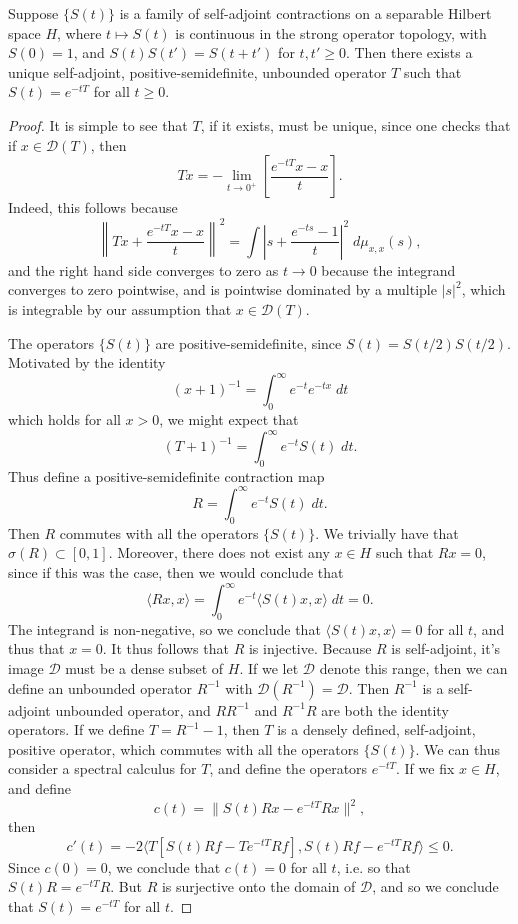 \begin{lemma}
    Suppose $\{ S(t) \}$ is a family of self-adjoint contractions on a separable Hilbert space $H$, where $t \mapsto S(t)$ is continuous in the strong operator topology, with $S(0) = 1$, and $S(t) S(t') = S(t + t')$ for $t,t' \geq 0$. Then there exists a unique self-adjoint, positive-semidefinite, unbounded operator $T$ such that $S(t) = e^{-tT}$ for all $t \geq 0$.
\end{lemma}
\begin{proof}
    It is simple to see that $T$, if it exists, must be unique, since one checks that if $x \in \mathcal{D}(T)$, then
    \[ Tx = - \lim_{t \to 0^+} \left[ \frac{e^{-tT} x - x}{t} \right]. \]
    Indeed, this follows because
    \[ \left\| Tx + \frac{e^{-tT} x - x}{t} \right\|^2 = \int \left| s + \frac{e^{-ts} - 1}{t} \right|^2 \;d\mu_{x,x}(s), \]
    and the right hand side converges to zero as $t \to 0$ because the integrand converges to zero pointwise, and is pointwise dominated by a multiple $|s|^2$, which is integrable by our assumption that $x \in \mathcal{D}(T)$.

    The operators $\{ S(t) \}$ are positive-semidefinite, since $S(t) = S(t/2) S(t/2)$. Motivated by the identity
    \[ (x + 1)^{-1} = \int_0^\infty e^{-t} e^{-tx}\; dt \]
    which holds for all $x > 0$, we might expect that
    \[ (T + 1)^{-1} = \int_0^\infty e^{-t} S(t)\; dt. \]
    Thus define a positive-semidefinite contraction map
    \[ R = \int_0^\infty e^{-t} S(t)\; dt. \]
    Then $R$ commutes with all the operators $\{ S(t) \}$. We trivially have that $\sigma(R) \subset[0,1]$. Moreover, there does not exist any $x \in H$ such that $Rx = 0$, since if this was the case, then we would conclude that
    \[ \langle Rx, x \rangle = \int_0^\infty e^{-t} \langle S(t) x, x \rangle\; dt = 0. \]
    The integrand is non-negative, so we conclude that $\langle S(t) x, x \rangle = 0$ for all $t$, and thus that $x = 0$. It thus follows that $R$ is injective. Because $R$ is self-adjoint, it's image $\mathcal{D}$ must be a dense subset of $H$. If we let $\mathcal{D}$ denote this range, then we can define an unbounded operator $R^{-1}$ with $\mathcal{D}(R^{-1}) = \mathcal{D}$. Then $R^{-1}$ is a self-adjoint unbounded operator, and $RR^{-1}$ and $R^{-1}R$ are both the identity operators. If we define $T = R^{-1} - 1$, then $T$ is a densely defined, self-adjoint, positive operator, which commutes with all the operators $\{ S(t) \}$. We can thus consider a spectral calculus for $T$, and define the operators $e^{-tT}$. If we fix $x \in H$, and define
    \[ c(t) = \| S(t) Rx - e^{-tT} Rx \|^2, \]
    then
    \[ c'(t) = - 2 \langle T \left[ S(t) Rf - T e^{-tT} Rf \right], S(t) Rf - e^{-tT} Rf \rangle \leq 0. \]
    Since $c(0) = 0$, we conclude that $c(t) = 0$ for all $t$, i.e. so that $S(t) R = e^{-tT} R$. But $R$ is surjective onto the domain of $\mathcal{D}$, and so we conclude that $S(t) = e^{-tT}$ for all $t$.
\end{proof}

